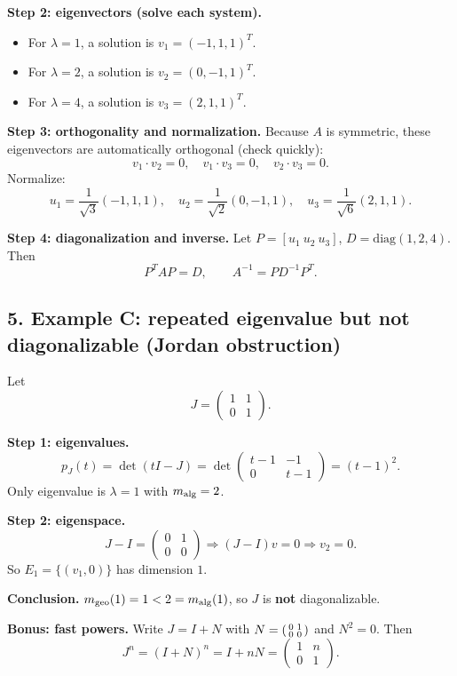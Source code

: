 \documentclass[12pt,a4paper]{article}
\theoremstyle{plain}
\theoremstyle{definition}      %
\begin{document}
\textbf{Step 2: eigenvectors (solve each system).}
\begin{itemize}
	\item For $\lambda=1$, a solution is $v_1=(-1,1,1)^T$.
	\item For $\lambda=2$, a solution is $v_2=(0,-1,1)^T$.
	\item For $\lambda=4$, a solution is $v_3=(2,1,1)^T$.
\end{itemize}

\textbf{Step 3: orthogonality and normalization.}
Because $A$ is symmetric, these eigenvectors are automatically orthogonal (check quickly):
\[
v_1\cdot v_2=0,\quad v_1\cdot v_3=0,\quad v_2\cdot v_3=0.
\]
Normalize:
\[
u_1=\frac{1}{\sqrt3}(-1,1,1),\quad
u_2=\frac{1}{\sqrt2}(0,-1,1),\quad
u_3=\frac{1}{\sqrt6}(2,1,1).
\]

\textbf{Step 4: diagonalization and inverse.}
Let $P=[u_1\ u_2\ u_3]$, $D=\mathrm{diag}(1,2,4)$. Then
\[
P^TAP=D,\qquad A^{-1}=P D^{-1} P^T.
\]

\subsection*{5. Example C: repeated eigenvalue but not diagonalizable (Jordan obstruction)}

Let
\[
J=\begin{pmatrix}1&1\\0&1\end{pmatrix}.
\]

\textbf{Step 1: eigenvalues.}
\[
p_J(t)=\det(tI-J)=\det\begin{pmatrix}t-1&-1\\0&t-1\end{pmatrix}=(t-1)^2.
\]
Only eigenvalue is $\lambda=1$ with $m_{\rm alg}=2$.

\textbf{Step 2: eigenspace.}
\[
J-I=\begin{pmatrix}0&1\\0&0\end{pmatrix}
\Rightarrow (J-I)v=0 \Rightarrow v_2=0.
\]
So $E_1=\{(v_1,0)\}$ has dimension $1$.

\textbf{Conclusion.}
$m_{\rm geo}(1)=1<2=m_{\rm alg}(1)$, so $J$ is \textbf{not} diagonalizable.

\textbf{Bonus: fast powers.}
Write $J=I+N$ with $N=\begin{psmallmatrix}0&1\\0&0\end{psmallmatrix}$ and $N^2=0$. Then
\[
J^n=(I+N)^n=I+nN=\begin{pmatrix}1&n\\0&1\end{pmatrix}.
\]
\end{document}
